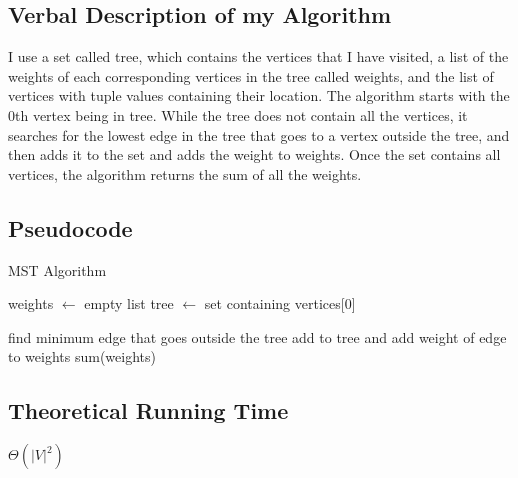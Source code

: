 \documentclass[12pt, letterpaper]{article}
\begin{document}
\subsection*{Verbal Description of my Algorithm}
I use a set called tree, which contains the vertices that I have visited, a list of the weights of each corresponding vertices in the tree called weights, and the list of vertices with tuple values containing their location. The algorithm starts with the 0th vertex being in tree. While the tree does not contain all the vertices, it searches for the lowest edge in the tree that goes to a vertex outside the tree, and then adds it to the set and adds the weight to weights. Once the set contains all vertices, the algorithm returns the sum of all the weights.

\subsection*{Pseudocode}
\begin{algorithm}
\caption{MST Algorithm}
\begin{algorithmic}
\State weights $\leftarrow$ empty list
\State tree $\leftarrow$ set containing vertices[0]

	\State find minimum edge that goes outside the tree
	\State add to tree and add weight of edge to weights
\EndWhile
\Return sum(weights)
\end{algorithmic}
\end{algorithm}

\subsection*{Theoretical Running Time}
$\Theta(|V|^2)$
\end{document}
